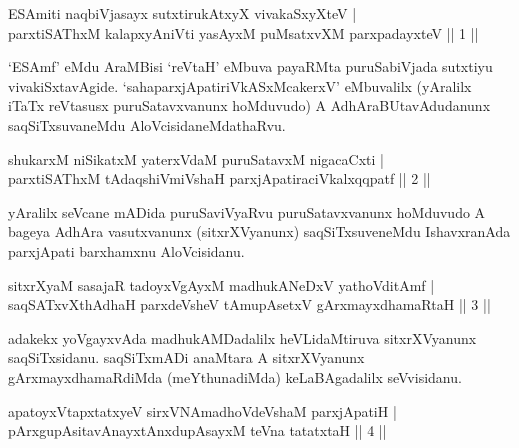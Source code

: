 \begin{shl}
ESAmiti naqbiVjasayx sutxtirukAtxyX vivakaSxyXteV | \\
parxtiSAThxM kalapxyAniVti yasAyxM puMsatxvXM parxpadayxteV \hfill|| 1 || 
\end{shl}

\begin{artha}
`ESAmf' eMdu AraMBisi `reVtaH' eMbuva payaRMta puruSabiVjada 
sutxtiyu vivakiSxtavAgide. `sahaparxjApatiriVkASxMcakerxV' eMbuvalilx 
(yAralilx iTaTx reVtasusx puruSatavxvanunx hoMduvudo) A 
AdhAraBUtavAdudanunx saqSiTxsuvaneMdu AloVcisidaneMdathaRvu.
\end{artha}


\begin{shl}
shukarxM niSikatxM yaterxVdaM puruSatavxM nigacaCxti | \\
parxtiSAThxM tAdaqshiVmiVshaH parxjApatiraciVkalxqqpatf \hfill|| 2 || 
\end{shl}

\begin{artha}
yAralilx seVcane mADida puruSaviVyaRvu puruSatavxvanunx hoMduvudo A 
bageya AdhAra vasutxvanunx (sitxrXVyanunx) saqSiTxsuveneMdu 
IshavxranAda parxjApati barxhamxnu AloVcisidanu.
\end{artha}


\begin{shl}
sitxrXyaM sasajaR tadoyxVgAyxM \footnotemark[1]madhukANeDxV yathoVditAmf | \\
saqSATxvX\s thAdhaH parxdeVsheV tAmupAsetxV \footnotemark[2]gArxmayxdhamaRtaH \hfill|| 3 || 
\end{shl}

\begin{artha}
adakekx yoVgayxvAda madhukAMDadalilx heVLidaMtiruva sitxrXVyanunx 
saqSiTxsidanu. saqSiTxmADi anaMtara A sitxrXVyanunx 
gArxmayxdhamaRdiMda (meYthunadiMda) keLaBAgadalilx seVvisidanu.
\end{artha}


\begin{shl}
apatoyxVtapxtatxyeV sirxVNAmadhoVdeVshaM parxjApatiH | \\
pArxgupAsitavAnayxtAnxdupAsayxM teVna tatatxtaH \hfill|| 4 || 
\end{shl}

